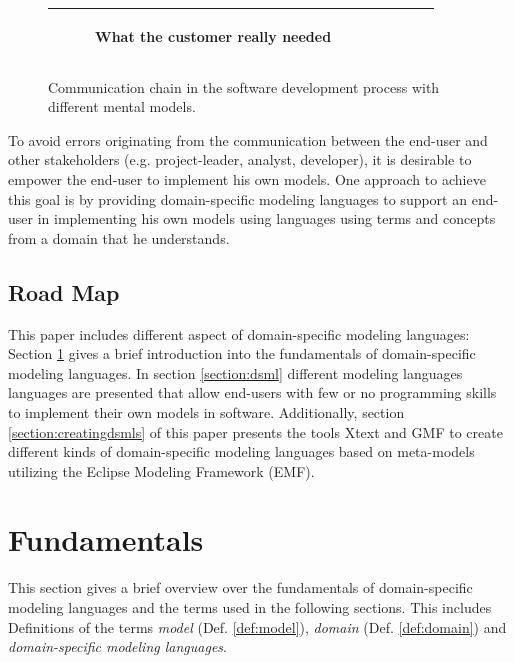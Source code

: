 \documentclass[runningheads,a4paper]{llncs}
\begin{document}
\begin{figure}[h]
\begin{center}
\begin{tabular}{|c|c|c|c|c|}
\begin{subfigure}[t]{0.15\textwidth}
\caption*{\tiny \centering What the customer really needed}\label{fig:whatneeded}\end{subfigure}\\
\hline
\end{tabular}
\caption{Communication chain in the software development process with different mental models.}
\label{fig:swingexample}
\end{center}
\end{figure}
To avoid errors originating from the communication between the end-user and other stakeholders (e.g. project-leader, analyst, developer), 
it is desirable to empower the end-user to implement his own models. 
One approach to achieve this goal is by providing domain-specific modeling languages to support an 
end-user in implementing his own models using languages using terms and concepts from a domain that he understands.

\subsection{Road Map}
This paper includes different aspect of domain-specific modeling languages:
Section \ref{section:fundamentals} gives a brief introduction into the fundamentals of domain-specific modeling languages.
In section \ref{section:dsml} different  modeling languages languages are presented that allow end-users with few or no
programming skills to implement their own models in software.
Additionally, section \ref{section:creatingdsmls} of this paper presents the tools Xtext and GMF to create different kinds of domain-specific modeling languages
based on meta-models utilizing the Eclipse Modeling Framework (EMF).


\section{Fundamentals}
\label{section:fundamentals}
This section gives a brief overview over the fundamentals of domain-specific modeling languages 
and the terms used in the following sections. This includes Definitions of the terms \emph{model} (Def. \ref{def:model}), 
\emph{domain} (Def. \ref{def:domain}) and \emph{domain-specific modeling languages}.
\end{document}
